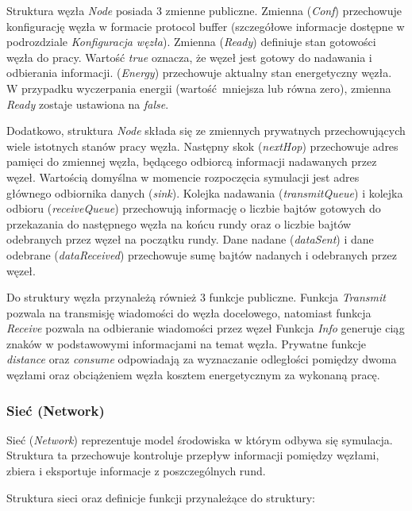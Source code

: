 \documentclass[a4paper,12pt,twoside,openany]{report}
\begin{document}
Struktura węzła \textit{Node} posiada 3 zmienne publiczne. Zmienna (\textit{Conf}) przechowuje konfigurację węzła w formacie protocol buffer (szczegółowe informacje dostępne w podrozdziale \textit{Konfiguracja węzła}).
Zmienna (\textit{Ready}) definiuje stan gotowości węzła do pracy. Wartość \textit{true} oznacza, że węzeł jest gotowy do nadawania i odbierania informacji.
(\textit{Energy}) przechowuje aktualny stan energetyczny węzła. W przypadku wyczerpania energii (wartość mniejsza lub równa zero), zmienna \textit{Ready} zostaje ustawiona na \textit{false}.

Dodatkowo, struktura \textit{Node} składa się ze zmiennych prywatnych przechowujących wiele istotnych stanów pracy węzła.
Następny skok (\textit{nextHop}) przechowuje adres pamięci do zmiennej węzła, będącego odbiorcą informacji nadawanych przez węzeł. Wartością domyślna w momencie rozpoczęcia symulacji jest adres głównego odbiornika danych (\textit{sink}).
Kolejka nadawania (\textit{transmitQueue}) i kolejka odbioru (\textit{receiveQueue}) przechowują informację o liczbie bajtów gotowych do przekazania do następnego węzła na końcu rundy oraz o liczbie bajtów odebranych przez węzeł na początku rundy.
Dane nadane (\textit{dataSent}) i dane odebrane (\textit{dataReceived}) przechowuje sumę bajtów nadanych i odebranych przez węzeł.

Do struktury węzła przynależą również 3 funkcje publiczne. Funkcja \textit{Transmit} pozwala na transmisję wiadomości do węzła docelowego, natomiast funkcja \textit{Receive} pozwala na odbieranie wiadomości przez węzeł
Funkcja \textit{Info} generuje ciąg znaków w podstawowymi informacjami na temat węzła.
Prywatne funkcje \textit{distance} oraz \textit{consume} odpowiadają za wyznaczanie odległości pomiędzy dwoma węzłami oraz obciążeniem węzła kosztem energetycznym za wykonaną pracę.

\subsubsection{Sieć (Network)}

Sieć (\textit{Network}) reprezentuje model środowiska w którym odbywa się symulacja. Struktura ta przechowuje kontroluje przepływ informacji pomiędzy węzłami,
zbiera i eksportuje informacje z poszczególnych rund.

Struktura sieci oraz definicje funkcji przynależące do struktury:
\end{document}
